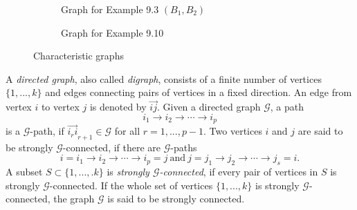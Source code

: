 \documentclass[draft, 12pt, reqno]{amsart}
\numberwithin{equation}{section}
\theoremstyle{plain}
\begin{document}
\begin{figure}[htbp]
\begin{subfigure}[b]{0.45\textwidth}
        \caption{Graph for Example 9.3 $(B_1, B_2)$}
        \label{fig:graph_c}
    \end{subfigure}
    \hfill
    \begin{subfigure}[b]{0.45\textwidth}
        \centering
        \caption{Graph for Example 9.10}
        \label{fig:graph_d}
    \end{subfigure}
    \caption{Characteristic graphs}
\end{figure}

\vspace{2mm}

A {\em directed graph}, also called {\em digraph}, consists of a finite number of vertices $\{1,...,k\}$ and  edges connecting pairs of vertices in a fixed direction. An edge from vertex $i$ to  vertex $j$ is denoted by $\overrightarrow{ij}$. Given a directed graph $\mathcal{G}$, a path 
$$i_1\to i_2 \to \cdots \to i_p$$
is a $\mathcal{G}$-path, if $\overrightarrow{i_ri}_{r+1}\in \mathcal{G}$ for all $r=1,...,p-1$.
Two vertices $i$ and $j$ are said to be strongly $\mathcal{G}$-connected, if there are $\mathcal{G}$-paths
$$ i=i_1\to i_2 \to \cdots \to i_p=j \ \mbox{and} \ j=j_1\to j_2 \to \cdots \to j_s=i.$$
 A subset $S\subset \{1,...,.k\}$ is {\em strongly $\mathcal{G}$-connected}, if every pair of vertices in $S$ is strongly $\mathcal{G}$-connected. If the whole set of vertices $\{1,...,k\}$ is strongly $\mathcal{G}$-connected, the graph $\mathcal{G}$ is said to be strongly connected.
\end{document}
